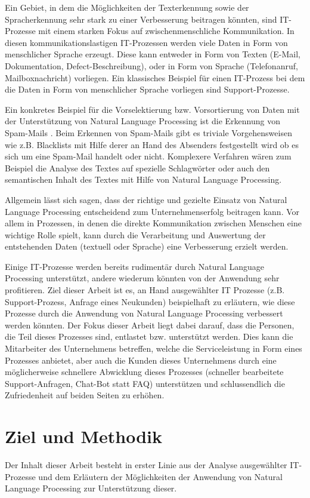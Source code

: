 Ein Gebiet, in dem die Möglichkeiten der Texterkennung sowie der Spracherkennung sehr stark zu einer Verbesserung beitragen könnten, sind IT-Prozesse mit einem starken Fokus auf zwischenmenschliche Kommunikation. In diesen kommunikationslastigen IT-Prozessen werden viele Daten in Form von menschlicher Sprache erzeugt. Diese kann entweder in Form von Texten (E-Mail, Dokumentation, Defect-Beschreibung), oder in Form von Sprache (Telefonanruf, Mailboxnachricht) vorliegen. Ein klassisches Beispiel für einen IT-Prozess bei dem die Daten in Form von menschlicher Sprache vorliegen sind Support-Prozesse. 

Ein konkretes Beispiel für die Vorselektierung bzw. Vorsortierung von Daten mit der Unterstützung von Natural Language Processing ist die Erkennung von Spam-Mails \cite{Dinsoreanu2014}. Beim Erkennen von Spam-Mails gibt es triviale Vorgehensweisen wie z.B. Blacklists mit Hilfe derer an Hand des Absenders festgestellt wird ob es sich um eine Spam-Mail handelt oder nicht. Komplexere Verfahren wären zum Beispiel die Analyse des Textes auf spezielle Schlagwörter oder auch den semantischen Inhalt des Textes mit Hilfe von Natural Language Processing.

Allgemein lässt sich sagen, dass der richtige und gezielte Einsatz von Natural Language Processing entscheidend zum Unternehmenserfolg beitragen kann. Vor allem in Prozessen, in denen die direkte Kommunikation zwischen Menschen eine wichtige Rolle spielt, kann durch die Verarbeitung und Auswertung der entstehenden Daten (textuell oder Sprache) eine Verbesserung erzielt werden.

Einige IT-Prozesse werden bereits rudimentär durch Natural Language Processing unterstützt, andere wiederum könnten von der Anwendung sehr profitieren. Ziel dieser Arbeit ist es, an Hand ausgewählter IT Prozesse (z.B. Support-Prozess, Anfrage eines Neukunden) beispielhaft zu erläutern, wie diese Prozesse durch die Anwendung von Natural Language Processing verbessert werden könnten. Der Fokus dieser Arbeit liegt dabei darauf, dass die Personen, die Teil dieses Prozesses sind, entlastet bzw. unterstützt werden. Dies kann die Mitarbeiter des Unternehmens betreffen, welche die Serviceleistung in Form eines Prozesses anbietet, aber auch die Kunden dieses Unternehmens durch eine möglicherweise schnellere Abwicklung dieses Prozesses (schneller bearbeitete Support-Anfragen, Chat-Bot statt FAQ) unterstützen und schlussendlich die Zufriedenheit auf beiden Seiten zu erhöhen. 

\section{Ziel und Methodik}
Der Inhalt dieser Arbeit besteht in erster Linie aus der Analyse ausgewählter IT-Prozesse und dem Erläutern der Möglichkeiten der Anwendung von Natural Language Processing zur Unterstützung dieser. 


